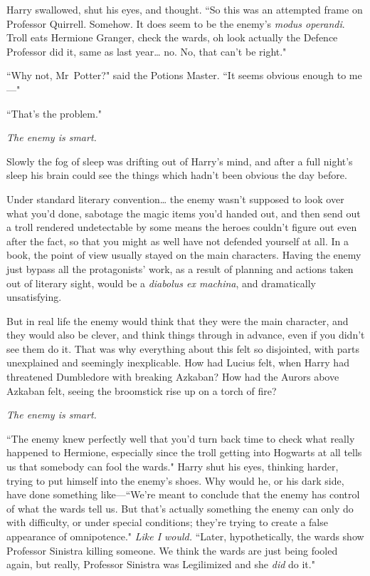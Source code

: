 Harry swallowed, shut his eyes, and thought. ``So this was an attempted frame on Professor Quirrell. Somehow. It does seem to be the enemy's \emph{modus operandi}. Troll eats Hermione Granger, check the wards, oh look actually the Defence Professor did it, same as last year{\ldots} no. No, that can't be right."

``Why not, Mr~Potter?" said the Potions Master. ``It seems obvious enough to me—"

``That's the problem."

\emph{The enemy is smart.}

Slowly the fog of sleep was drifting out of Harry's mind, and after a full night's sleep his brain could see the things which hadn't been obvious the day before.

Under standard literary convention{\ldots} the enemy wasn't supposed to look over what you'd done, sabotage the magic items you'd handed out, and then send out a troll rendered undetectable by some means the heroes couldn't figure out even after the fact, so that you might as well have not defended yourself at all. In a book, the point of view usually stayed on the main characters. Having the enemy just bypass all the protagonists' work, as a result of planning and actions taken out of literary sight, would be a \emph{diabolus ex machina}, and dramatically unsatisfying.

But in real life the enemy would think that they were the main character, and they would also be clever, and think things through in advance, even if you didn't see them do it. That was why everything about this felt so disjointed, with parts unexplained and seemingly inexplicable. How had Lucius felt, when Harry had threatened Dumbledore with breaking Azkaban? How had the Aurors above Azkaban felt, seeing the broomstick rise up on a torch of fire?

\emph{The enemy is smart.}

``The enemy knew perfectly well that you'd turn back time to check what really happened to Hermione, especially since the troll getting into Hogwarts at all tells us that somebody can fool the wards." Harry shut his eyes, thinking harder, trying to put himself into the enemy's shoes. Why would he, or his dark side, have done something like—``We're meant to conclude that the enemy has control of what the wards tell us. But that's actually something the enemy can only do with difficulty, or under special conditions; they're trying to create a false appearance of omnipotence." \emph{Like I would.} ``Later, hypothetically, the wards show Professor Sinistra killing someone. We think the wards are just being fooled again, but really, Professor Sinistra was Legilimized and she \emph{did} do it."

